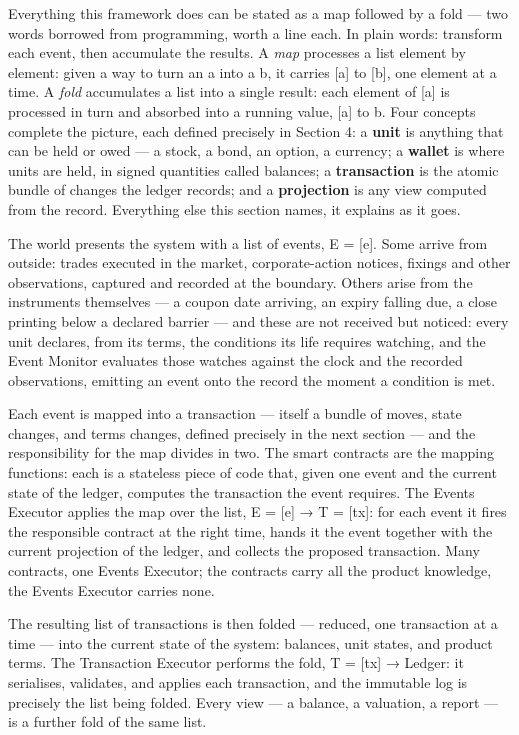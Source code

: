 \documentclass[11pt,a4paper]{article}
\begin{document}
Everything this framework does can be stated as a map followed by a fold
--- two words borrowed from programming, worth a line each. In plain
words: transform each event, then accumulate the results. A \emph{map}
processes a list element by element: given a way to turn an a into a b,
it carries {[}a{]} to {[}b{]}, one element at a time. A \emph{fold}
accumulates a list into a single result: each element of {[}a{]} is
processed in turn and absorbed into a running value, {[}a{]} to b. Four
concepts complete the picture, each defined precisely in Section 4: a
\textbf{unit} is anything that can be held or owed --- a stock, a bond,
an option, a currency; a \textbf{wallet} is where units are held, in
signed quantities called balances; a \textbf{transaction} is the atomic
bundle of changes the ledger records; and a \textbf{projection} is any
view computed from the record. Everything else this section names, it
explains as it goes.

The world presents the system with a list of events, E = {[}e{]}. Some
arrive from outside: trades executed in the market, corporate-action
notices, fixings and other observations, captured and recorded at the
boundary. Others arise from the instruments themselves --- a coupon date
arriving, an expiry falling due, a close printing below a declared
barrier --- and these are not received but noticed: every unit declares,
from its terms, the conditions its life requires watching, and the Event
Monitor evaluates those watches against the clock and the recorded
observations, emitting an event onto the record the moment a condition
is met.

Each event is mapped into a transaction --- itself a bundle of moves,
state changes, and terms changes, defined precisely in the next section
--- and the responsibility for the map divides in two. The smart
contracts are the mapping functions: each is a stateless piece of code
that, given one event and the current state of the ledger, computes the
transaction the event requires. The Events Executor applies the map over
the list, E = {[}e{]} → T = {[}tx{]}: for each event it fires the
responsible contract at the right time, hands it the event together with
the current projection of the ledger, and collects the proposed
transaction. Many contracts, one Events Executor; the contracts carry
all the product knowledge, the Events Executor carries none.

The resulting list of transactions is then folded --- reduced, one
transaction at a time --- into the current state of the system:
balances, unit states, and product terms. The Transaction Executor
performs the fold, T = {[}tx{]} → Ledger: it serialises, validates, and
applies each transaction, and the immutable log is precisely the list
being folded. Every view --- a balance, a valuation, a report --- is a
further fold of the same list.
\end{document}
